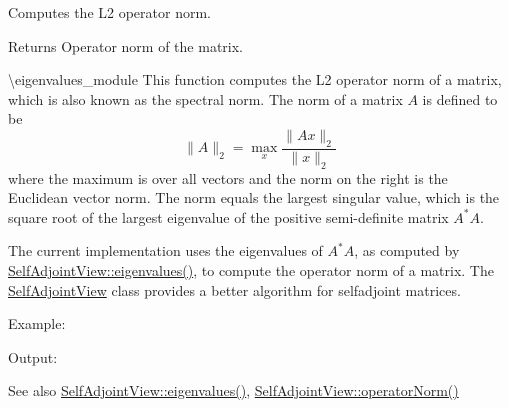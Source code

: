 Computes the L2 operator norm. 

\begin{DoxyReturn}{Returns}
Operator norm of the matrix.
\end{DoxyReturn}
\textbackslash{}eigenvalues\+\_\+module This function computes the L2 operator norm of a matrix, which is also known as the spectral norm. The norm of a matrix $ A $ is defined to be \[ \|A\|_2 = \max_x \frac{\|Ax\|_2}{\|x\|_2} \] where the maximum is over all vectors and the norm on the right is the Euclidean vector norm. The norm equals the largest singular value, which is the square root of the largest eigenvalue of the positive semi-\/definite matrix $ A^*A $.

The current implementation uses the eigenvalues of $ A^*A $, as computed by \mbox{\hyperlink{class_eigen_1_1_self_adjoint_view_ad4f34424b4ea12de9bbc5623cb938b4f}{Self\+Adjoint\+View\+::eigenvalues()}}, to compute the operator norm of a matrix. The \mbox{\hyperlink{class_eigen_1_1_self_adjoint_view}{Self\+Adjoint\+View}} class provides a better algorithm for selfadjoint matrices.

Example\+: 
\begin{DoxyCodeInclude}{0}
\end{DoxyCodeInclude}
 Output\+: 
\begin{DoxyVerbInclude}
\end{DoxyVerbInclude}


\begin{DoxySeeAlso}{See also}
\mbox{\hyperlink{class_eigen_1_1_self_adjoint_view_ad4f34424b4ea12de9bbc5623cb938b4f}{Self\+Adjoint\+View\+::eigenvalues()}}, \mbox{\hyperlink{class_eigen_1_1_self_adjoint_view_a12a7da482e31ec9c517dca92dd7bae61}{Self\+Adjoint\+View\+::operator\+Norm()}} 
\end{DoxySeeAlso}
\mbox{\label{class_eigen_1_1_matrix_base_aa93be3d50d662b7bb54bfd346e480675}} 
